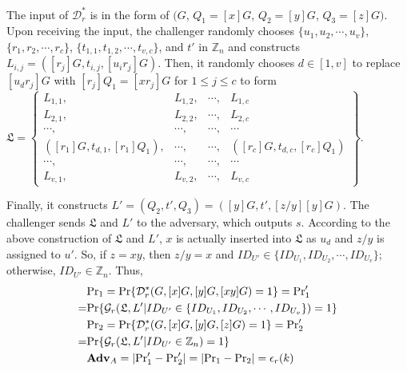 {{{{{%
%


The input of $\mathcal{D}^*_r$ is in the form of $(G$, $Q_1=[x]G$, $Q_2=[y]G$, $Q_3=[z]G)$. Upon receiving the input, the challenger randomly chooses $\{u_1, u_2, \cdots, u_v\}$, $\{r_1, r_2, \cdots, r_c\}$, $\{t_{1, 1}, t_{1, 2}, \cdots, t_{v, c}\}$, and $t'$ in $\mathbb{Z}_n$ and constructs $L_{i, j} = ([r_j]G, t_{i, j}, [u_ir_j]G)$. Then, it randomly chooses $d \in [1, v]$ to replace $[u_d r_j]G$ with $[r_j]Q_1=[xr_j]G$ for $1\leq j \leq c$ to form $\mathfrak{L}=\left \{ \begin{matrix}
L_{1,1},&L_{1,2},&\cdots,&L_{1,c}\\
L_{2,1},& L_{2,2},&\cdots,&L_{2,c}\\
\cdots,&\cdots,&\cdots,&\cdots\\
([r_{1}]G, t_{d, 1}, [r_{1}]Q_1),&\cdots,&\cdots,&([r_{c}]G, t_{d, c}, [r_{c}]Q_1)\\
\cdots,&\cdots,&\cdots,&\cdots\\
L_{v,1},&L_{v,2},&\cdots,&L_{v,c}
\end{matrix}\right\}$.

%
Finally, it constructs $L' = (Q_2, t', Q_3) = ([y]G, t', [z/y][y]G)$. The challenger sends $\mathfrak{L}$ and $L'$ to the adversary, which outputs $s$. According to the above construction of $\mathfrak{L}$ and $L'$,
    $x$ is actually inserted into $\mathfrak{L}$ as $u_d$
    and $z/y$ is assigned to $u'$.
So, if $z = xy$, then $z/y=x$ and $ID_{U'} \in \{ID_{U_1}, ID_{U_2}, \cdots, ID_{U_v}\}$;
    otherwise, $ID_{U'} \in \mathbb{Z}_n$.
Thus,
\begin{align*}
&{\rm Pr}_1={\rm Pr}\{\mathcal{D}^*_r(G, [x]G, [y]G, [xy]G)=1\}={\rm Pr}'_1 \\=&  {\rm Pr}\{\mathcal{G}_r(\mathfrak{L}, L'|ID_{U'} \in \{ID_{U_1}, ID_{U_2}, \cdots, ID_{U_v}\})=1\} \\
&{\rm Pr}_2={\rm Pr}\{\mathcal{D}^*_r(G, [x]G, [y]G, [z]G)=1\} ={\rm Pr}'_2 \\=&  {\rm Pr}\{\mathcal{G}_r(\mathfrak{L}, L'|ID_{U'} \in \mathbb{Z}_n)=1\}\\
&{\mathbf{Adv}}_{A}=|{\rm Pr}'_1-{\rm Pr}'_2|=|{\rm Pr}_1-{\rm Pr}_2|=\epsilon_{r}(k)
\end{align*}

}}}}}
